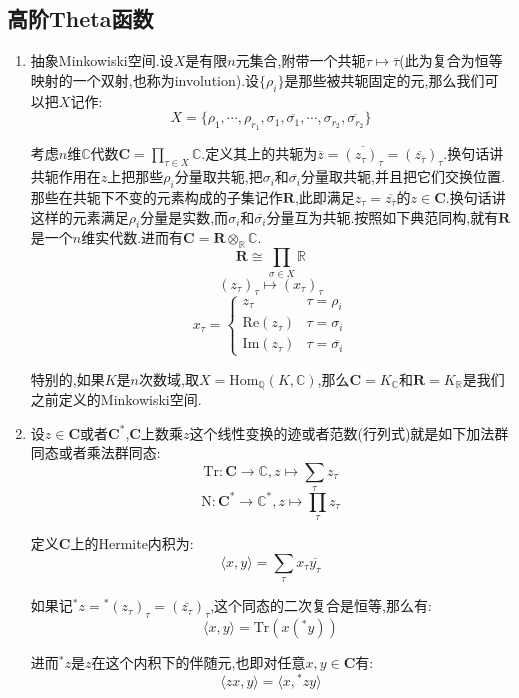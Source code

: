 \subsection{高阶Theta函数}
\begin{enumerate}
	\item 抽象Minkowiski空间.设$X$是有限$n$元集合,附带一个共轭$\tau\mapsto\overline{\tau}$(此为复合为恒等映射的一个双射,也称为involution).设$\{\rho_i\}$是那些被共轭固定的元,那么我们可以把$X$记作:
	$$X=\{\rho_1,\cdots,\rho_{r_1},\sigma_1,\overline{\sigma_1},\cdots,\sigma_{r_2},\overline{\sigma_{r_2}}\}$$
	
	考虑$n$维$\mathbb{C}$代数$\textbf{C}=\prod_{\tau\in X}\mathbb{C}$.定义其上的共轭为$\overline{z}=\overline{(z_{\tau})_{\tau}}=(\overline{z_{\overline{\tau}}})_{\tau}$.换句话讲共轭作用在$z$上把那些$\rho_i$分量取共轭,把$\sigma_i$和$\overline{\sigma_i}$分量取共轭,并且把它们交换位置.那些在共轭下不变的元素构成的子集记作$\textbf{R}$,此即满足$z_{\tau}=\overline{z_{\overline{\tau}}}$的$z\in\textbf{C}$.换句话讲这样的元素满足$\rho_i$分量是实数,而$\sigma_i$和$\overline{\sigma_i}$分量互为共轭.按照如下典范同构,就有$\textbf{R}$是一个$n$维实代数.进而有$\textbf{C}=\textbf{R}\otimes_{\mathbb{R}}\mathbb{C}$.
	$$\textbf{R}\cong\prod_{\sigma\in X}\mathbb{R}$$
	$$(z_{\tau})_{\tau}\mapsto(x_{\tau})_{\tau}$$
	$$x_{\tau}=\left\{\begin{array}{cc}z_{\tau}&\tau=\rho_i\\\mathrm{Re}(z_{\tau})&\tau=\sigma_i\\\mathrm{Im}(z_{\tau})&\tau=\overline{\sigma_i}\end{array}\right.$$
	
	特别的,如果$K$是$n$次数域,取$X=\mathrm{Hom}_{\mathbb{Q}}(K,\mathbb{C})$,那么$\textbf{C}=K_{\mathbb{C}}$和$\textbf{R}=K_{\mathbb{R}}$是我们之前定义的Minkowiski空间.
	\item 设$z\in\textbf{C}$或者$\textbf{C}^*$,$\textbf{C}$上数乘$z$这个线性变换的迹或者范数(行列式)就是如下加法群同态或者乘法群同态:
	$$\mathrm{Tr}:\textbf{C}\to\mathbb{C},z\mapsto\sum_{\tau}z_{\tau}$$
	$$\mathrm{N}:\textbf{C}^*\to\mathbb{C}^*,z\mapsto\prod_{\tau}z_{\tau}$$
	
	定义$\textbf{C}$上的Hermite内积为:
	$$\langle x,y\rangle=\sum_{\tau}x_{\tau}\overline{y_{\tau}}$$
	
	如果记${^*z}={^*(z_{\tau})_{\tau}}=(\overline{z_{\tau}})_{\tau}$,这个同态的二次复合是恒等,那么有:
	$$\langle x,y\rangle=\mathrm{Tr}(x({^*y}))$$
	
	进而${^*z}$是$z$在这个内积下的伴随元,也即对任意$x,y\in\textbf{C}$有:
	$$\langle zx,y\rangle=\langle x,{^*z}y\rangle$$
	

\end{enumerate}
